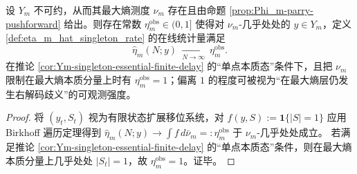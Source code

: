 \begin{proposition}\label{prop:eta_m_hat_ergodic_limit}
设 \(Y_m\) 不可约，从而其最大熵测度 \(\nu_m\) 存在且由命题 \ref{prop:Phi_m-parry-pushforward} 给出。则存在常数 \(\eta_m^{\mathrm{obs}}\in(0,1]\) 使得对 \(\nu_m\)-几乎处处的 \(y\in Y_m\)，定义 \ref{def:eta_m_hat_singleton_rate} 的在线统计量满足
\[
\widehat\eta_m(N;y)\ \xrightarrow[N\to\infty]{}\ \eta_m^{\mathrm{obs}}.
\]
在推论 \ref{cor:Ym-singleton-essential-finite-delay} 的“单点本质态”条件下，且把 \(\nu_m\) 限制在最大熵本质分量上时有 \(\eta_m^{\mathrm{obs}}=1\)；偏离 \(1\) 的程度可被视为“在最大熵层仍发生右解码歧义”的可观测强度。
\end{proposition}
\begin{proof}
将 \((y_t,S_t)\) 视为有限状态扩展移位系统，对 \(f(y,S):=\mathbf{1}\{|S|=1\}\) 应用 Birkhoff 遍历定理得到
\(
\widehat\eta_m(N;y)\to \int f\,d\bar\nu_m=:\eta_m^{\mathrm{obs}}
\)
于 \(\nu_m\)-几乎处处成立。
若满足推论 \ref{cor:Ym-singleton-essential-finite-delay} 的“单点本质态”条件，则在最大熵本质分量上几乎处处 \(|S_t|=1\)，故 \(\eta_m^{\mathrm{obs}}=1\)。证毕。
\end{proof}
